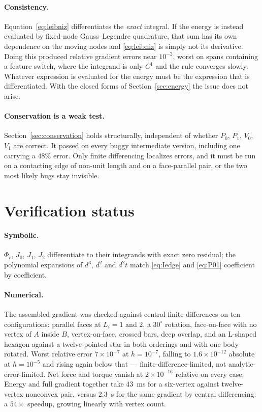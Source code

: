 \documentclass[11pt]{article}
\begin{document}
\paragraph{Consistency.} Equation~\eqref{eq:leibniz} differentiates the \emph{exact} integral. If the energy is instead evaluated by fixed-node Gauss--Legendre quadrature, that sum has its own dependence on the moving nodes and \eqref{eq:leibniz} is simply not its derivative. Doing this produced relative gradient errors near $10^{-2}$, worst on spans containing a feature switch, where the integrand is only $C^1$ and the rule converges slowly. Whatever expression is evaluated for the energy must be the expression that is differentiated. With the closed forms of Section~\ref{sec:energy} the issue does not arise.

\paragraph{Conservation is a weak test.} Section~\ref{sec:conservation} holds structurally, independent of whether $P_0$, $P_1$, $V_0$, $V_1$ are correct. It passed on every buggy intermediate version, including one carrying a $48\%$ error. Only finite differencing localizes errors, and it must be run on a contacting edge of non-unit length and on a face-parallel pair, or the two most likely bugs stay invisible.

\section{Verification status}
\label{sec:status}

\paragraph{Symbolic.} $\Phi_r$, $J_0$, $J_1$, $J_2$ differentiate to their integrands with exact zero residual; the polynomial expansions of $d^3$, $d^2$ and $d^2t$ match \eqref{eq:Iedge} and \eqref{eq:P01} coefficient by coefficient.

\paragraph{Numerical.} The assembled gradient was checked against central finite differences on ten configurations: parallel faces at $L_i = 1$ and $2$, a $30^\circ$ rotation, face-on-face with no vertex of $A$ inside $B$, vertex-on-face, crossed bars, deep overlap, and an L-shaped hexagon against a twelve-pointed star in both orderings and with one body rotated. Worst relative error $7\times10^{-7}$ at $h = 10^{-7}$, falling to $1.6\times10^{-12}$ absolute at $h = 10^{-5}$ and rising again below that --- finite-difference-limited, not analytic-error-limited. Net force and torque vanish at $2\times10^{-16}$ relative on every case. Energy and full gradient together take $43$~ms for a six-vertex against twelve-vertex nonconvex pair, versus $2.3$~s for the same gradient by central differencing: a $54\times$ speedup, growing linearly with vertex count.
\end{document}
